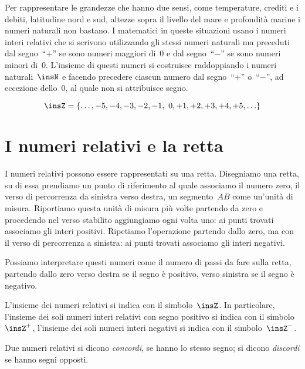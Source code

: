 Per rappresentare le grandezze che hanno due sensi, come temperature, crediti e 
i debiti, latitudine nord e sud,
altezze sopra il livello del mare e profondità marine i numeri naturali non 
bastano. I matematici in queste
situazioni usano i numeri interi relativi che si scrivono utilizzando gli stessi 
numeri naturali ma preceduti
dal segno~``$+$'' se sono numeri maggiori di~0 e dal segno~``$-$'' se sono 
numeri minori di~0. L'insieme di questi numeri
si costruisce raddoppiando i numeri naturali~$\insN$ e facendo precedere ciascun 
numero dal segno~``$+$'' o~``$-$'',
ad eccezione dello~0, al quale non si attribuisce segno.

\[ \insZ=\lbrace\ldots,-5, -4, -3, -2, -1,~0, +1, +2, +3, +4, +5, \ldots\rbrace 
\]
\newpage

\section{I numeri relativi e la retta}
\label{sec:02_retta}

I numeri relativi possono essere rappresentati su una retta. Disegniamo una 
retta, su di essa prendiamo
un punto di riferimento al quale associamo il numero zero, il verso di 
percorrenza da sinistra verso destra,
un segmento~$AB$ come un'unità di misura. Riportiamo questa unità di misura più 
volte partendo da zero e
procedendo nel verso stabilito aggiungiamo ogni volta uno: ai punti trovati 
associamo gli interi positivi.
Ripetiamo l'operazione partendo dallo zero, ma con il verso di percorrenza a 
sinistra: ai punti trovati associamo
gli interi negativi.

\begin{center}
 
\end{center}

Possiamo interpretare questi numeri come il numero di passi da fare sulla retta, 
partendo dallo zero verso
destra se il segno è positivo, verso sinistra se il segno è negativo.

L'insieme dei numeri relativi si indica con il simbolo~$\insZ$. In particolare, 
l'insieme dei soli numeri interi relativi
con segno positivo si indica con il simbolo~$\insZ^+$,
l'insieme dei soli numeri interi negativi si indica con il simbolo~$\insZ^-$.

\begin{definizione}
 Due numeri relativi si dicono \emph{concordi}, se hanno lo stesso segno; si 
dicono \emph{discordi} se hanno
 segni opposti.
\end{definizione}

